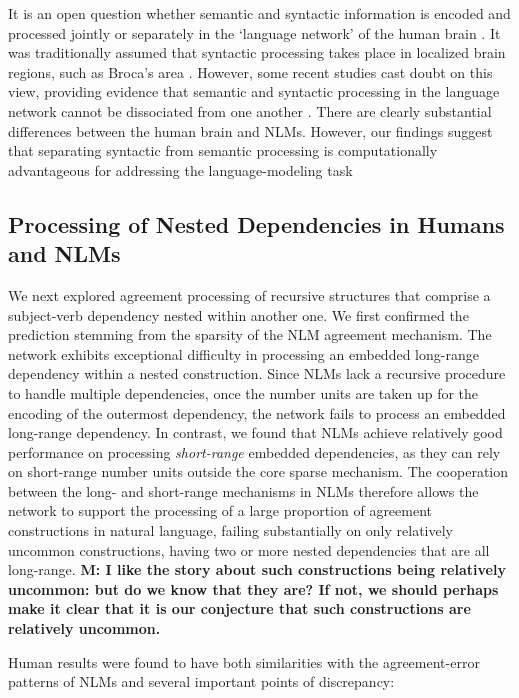 It is an open question whether semantic and syntactic information is encoded and processed jointly or separately in the `language network' of the human brain \citep{pallier2011cortical}. It was traditionally assumed that syntactic processing takes place in localized brain regions, such as Broca's area \citep[e.g.,][]{dapretto1999form}. However, some recent studies cast doubt on this view, providing evidence that semantic and syntactic processing in the language network cannot be dissociated from one another \citep{mollica2018high, siegelman2019attempt, fedorenko2020lack}. There are clearly substantial differences between the human brain and NLMs. However, our findings suggest that separating syntactic from semantic processing is computationally advantageous for addressing the language-modeling task \citep[][for related studies.]{ullman2004contributions, o2006biologically, russin2019reilly} 

\subsection{Processing of Nested Dependencies in Humans and NLMs}
We next explored agreement processing of recursive structures that comprise a subject-verb dependency nested within another one. We first confirmed the prediction stemming from the sparsity of the NLM agreement mechanism. The network exhibits exceptional difficulty in processing an embedded long-range dependency within a nested construction. Since NLMs lack a recursive procedure to handle multiple dependencies, once the number units are taken up for the encoding of the outermost dependency, the network fails to process an embedded long-range dependency. In contrast, we found that NLMs achieve relatively good performance on processing \textit{short-range} embedded dependencies, as they can rely on short-range number units outside the core sparse mechanism. The cooperation between the long- and short-range mechanisms in NLMs therefore allows the network to support the processing of a large proportion of agreement constructions in natural language, failing substantially on only relatively uncommon constructions, having two or more nested dependencies that are all long-range. \textbf{M: I like the story about such constructions being relatively uncommon: but do we know that they are? If not, we should perhaps make it clear that it is our conjecture that such constructions are relatively uncommon.}

Human results were found to have both similarities with the agreement-error patterns of NLMs and several important points of discrepancy:

